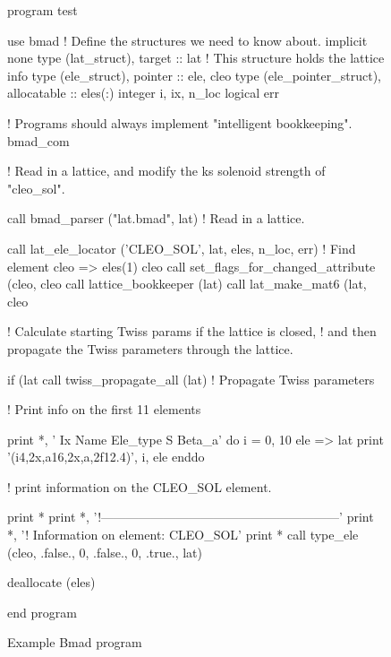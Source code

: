 \begin{figure}[htp]
\begin{listing}{1}
program test

use bmad                 ! Define the structures we need to know about.
implicit none
type (lat_struct), target :: lat   ! This structure holds the lattice info
type (ele_struct), pointer :: ele, cleo
type (ele_pointer_struct), allocatable :: eles(:)
integer i, ix, n_loc
logical err

! Programs should always implement "intelligent bookkeeping".
bmad_com%

! Read in a lattice, and modify the ks solenoid strength of "cleo_sol".

call bmad_parser ("lat.bmad", lat)  ! Read in a lattice.

call lat_ele_locator ('CLEO_SOL', lat, eles, n_loc, err)  ! Find element
cleo => eles(1)%
cleo%
call set_flags_for_changed_attribute (cleo, cleo%
call lattice_bookkeeper (lat)
call lat_make_mat6 (lat, cleo%

! Calculate starting Twiss params if the lattice is closed, 
! and then propagate the Twiss parameters through the lattice.

if (lat%
call twiss_propagate_all (lat)      ! Propagate Twiss parameters

! Print info on the first 11 elements

print *, ' Ix  Name              Ele_type                   S      Beta_a'
do i = 0, 10
  ele => lat%
  print '(i4,2x,a16,2x,a,2f12.4)', i, ele%
enddo

! print information on the CLEO_SOL element.

print *
print *, '!---------------------------------------------------------'
print *, '! Information on element: CLEO_SOL'
print *
call type_ele (cleo, .false., 0, .false., 0, .true., lat)

deallocate (eles)

end program
\end{listing}
\caption{Example Bmad program}
\label{f:program}
\end{figure}

